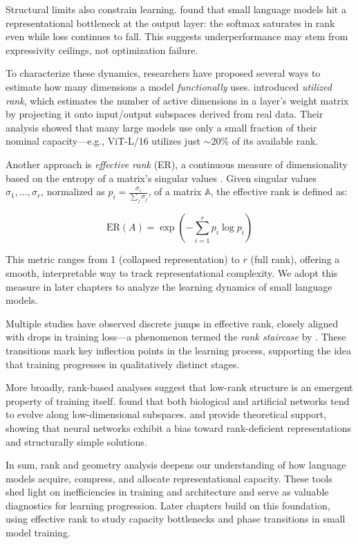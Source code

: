 Structural limits also constrain learning. \citet{godey2024small} found that small language models hit a representational bottleneck at the output layer: the softmax saturates in rank even while loss continues to fall. This suggests underperformance may stem from expressivity ceilings, not optimization failure.

To characterize these dynamics, researchers have proposed several ways to estimate how many dimensions a model \textit{functionally} uses. \citet{garg2025utilizedrank} introduced \textit{utilized rank}, which estimates the number of active dimensions in a layer's weight matrix by projecting it onto input/output subspaces derived from real data. Their analysis showed that many large models use only a small fraction of their nominal capacity—e.g., ViT-L/16 utilizes just $\sim$20\% of its available rank.

Another approach is \textit{effective rank} (ER), a continuous measure of dimensionality based on the entropy of a matrix's singular values \citep{roy2007effectiverank}. Given singular values $\sigma_1, \dots, \sigma_r$, normalized as $p_i = \frac{\sigma_i}{\sum_j \sigma_j}$, of a matrix $\mathbb{A}$, the effective rank is defined as:

\[
\mathrm{ER}(A) = \exp\left(-\sum_{i=1}^r p_i \log p_i\right)
\]

This metric ranges from 1 (collapsed representation) to $r$ (full rank), offering a smooth, interpretable way to track representational complexity. We adopt this measure in later chapters to analyze the learning dynamics of small language models.

Multiple studies have observed discrete jumps in effective rank, closely aligned with drops in training loss—a phenomenon termed the \textit{rank staircase} by \citet{yang2024rankstaircase}. These transitions mark key inflection points in the learning process, supporting the idea that training progresses in qualitatively distinct stages.

More broadly, rank-based analyses suggest that low-rank structure is an emergent property of training itself. \citet{pellegrino2023lowrank} found that both biological and artificial networks tend to evolve along low-dimensional subspaces. \citet{feng2022rank} and \citet{minyoung2022lowrank} provide theoretical support, showing that neural networks exhibit a bias toward rank-deficient representations and structurally simple solutions.

In sum, rank and geometry analysis deepens our understanding of how language models acquire, compress, and allocate representational capacity. These tools shed light on inefficiencies in training and architecture and serve as valuable diagnostics for learning progression. Later chapters build on this foundation, using effective rank to study capacity bottlenecks and phase transitions in small model training.

